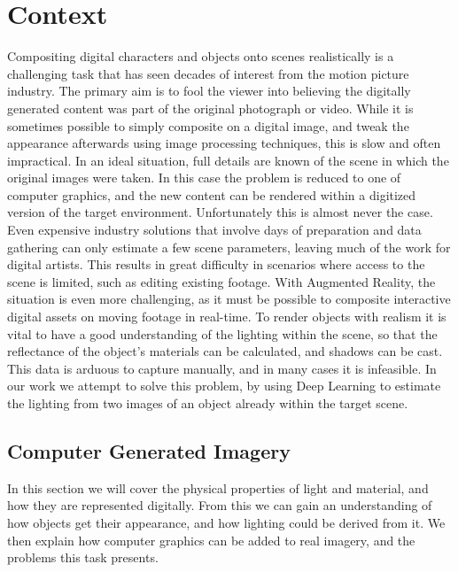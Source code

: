 \documentclass[ %
                    author={Gavin Parker},
                supervisor={Dr. Neill Campbell},
                    degree={MEng},
                     title={Deep Learning for Illumination Estimation from Stereo Images},
                  subtitle={},
                      type={Research},
                      year={2018} ]{dissertation}
\begin{document}
\mainmatter

\chapter{Context}
\label{chap:context}
Compositing digital characters and objects onto scenes realistically is a challenging task that has seen decades of interest from the motion picture industry. The primary aim is to fool the viewer into believing the digitally generated content was part of the original photograph or video. While it is sometimes possible to simply composite on a digital image, and tweak the appearance afterwards using image processing techniques, this is slow and often impractical. In an ideal situation, full details are known of the scene in which the original images were taken. In this case the problem is reduced to one of computer graphics, and the new content can be rendered within a digitized version of the target environment. Unfortunately this is almost never the case. Even expensive industry solutions that involve days of preparation and data gathering can only estimate a few scene parameters, leaving much of the work for digital artists. This results in great difficulty in scenarios where access to the scene is limited, such as editing existing footage. With Augmented Reality, the situation is even more challenging, as it must be possible to  composite interactive digital assets on moving footage in real-time.
\newline
To render objects with realism it is vital to have a good understanding of the lighting within the scene, so that the reflectance of the object's materials can be calculated, and shadows can be cast. This data is arduous to capture manually, and in many cases it is infeasible. In our work we attempt to solve this problem, by using Deep Learning to estimate the lighting from two images of an object already within the target scene.

\section{Computer Generated Imagery}
In this section we will cover the physical properties of light and material, and how they are represented digitally. From this we can gain an understanding of how objects get their appearance, and how lighting could be derived from it. We then explain how computer graphics can be added to real imagery, and the problems this task presents.
\end{document}
